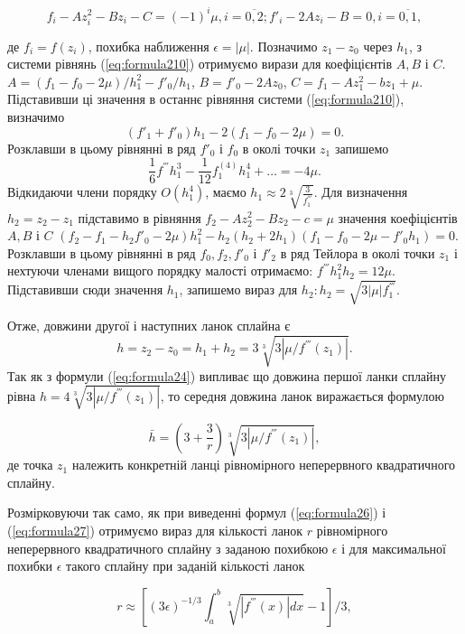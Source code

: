 \documentclass[ukrainian,14pt]{extarticle}
\begin{document}
\begin{equation}\label{eq:formula210}
    f_i - Az^2_i - Bz_i - C = (-1)^i \mu, i = \overline{0,2}; f'_i - 2Az_i - B = 0, i = \overline{0, 1},
\end{equation}

де $f_i = f(z_i)$, похибка наближення $\epsilon = |\mu|$. Позначимо $z_1 - z_0$ через $h_1$, з системи рівнянь (\ref{eq:formula210}) отримуємо вирази для коефіцієнтів $A, B$ і $C$. $A = (f_1 - f_0 - 2\mu) / h_1^2 - f'_0 / h_1$, $B=f'_0 - 2Az_0$, $C = f_1 - Az_1^2 - bz_1 + \mu$. Підставивши ці значення в останнє рівняння системи (\ref{eq:formula210}), визначимо
$$(f'_1 + f'_0) h_1 - 2(f_1 - f_0 -2\mu) = 0.$$
Розклавши в цьому рівнянні в ряд $f'_0$ і $f_0$ в околі точки $z_1$ запишемо
$$\frac{1}{6}f^{'''}h^3_1 - \frac{1}{12} f_1^{(4)}h_1^4 + \ldots = -4\mu.$$
Відкидаючи члени порядку $O(h_1^4)$, маємо $h_1 \approx 2 \sqrt[3]{\frac{3}{f^{'''}_1}}$. Для визначення $h_2 = z_2 - z_1$ підставимо в рівняння $f_2 - Az_2^2 - Bz_2 - c = \mu$ значення коефіцієнтів $A, B$ і $C$
$(f_2 - f_1 - h_2 f'_0 - 2\mu) h_1^2 - h_2(h_2 + 2h_1)(f_1 - f_0 - 2\mu - f'_0h_1) = 0.$
Розклавши в цьому рівнянні в ряд $f_0, f_2, f'_0$ і $f'_2$ в ряд Тейлора в околі точки $z_1$ і нехтуючи членами вищого порядку малості отримаємо: $f^{'''}h^2_1 h_2 = 12\mu$. Підставивши сюди значення $h_1$, запишемо вираз для $h_2: h_2 = \sqrt{3 |\mu| f^{'''}_1}$.

Отже, довжини другої і наступних ланок сплайна є
$$h = z_2 - z_0 = h_1 + h_2 = 3 \sqrt[3]{3 |\mu / f^{'''}(z_1)|}.$$ Так як з формули (\ref{eq:formula24}) випливає що довжина першої ланки сплайну рівна $h = 4\sqrt[3]{3 |\mu / f^{'''}(z_1)|}$, то середня довжина ланок виражається формулою

\begin{equation}\label{eq:formula211}
    \bar{h} = \left(3 + \frac{3}{r}\right) \sqrt[3]{3 |\mu / f^{'''}(z_1)|}, 
\end{equation}
де точка $z_1$ належить конкретній ланці рівномірного неперервного квадратичного сплайну.

Розмірковуючи так само, як при виведенні формул (\ref{eq:formula26}) і (\ref{eq:formula27}) отримуємо вираз для кількості ланок $r$ рівномірного неперервного квадратичного сплайну з заданою похибкою $\epsilon$ і для максимальної похибки $\epsilon$ такого сплайну при заданій кількості ланок

\begin{equation}\label{eq:formula212}
    r \approx \left[  (3\epsilon)^{-1/3} \int_a^b \sqrt[3]{|f^{'''}(x)| dx} - 1   \right] / 3 ,
\end{equation}
\end{document}
